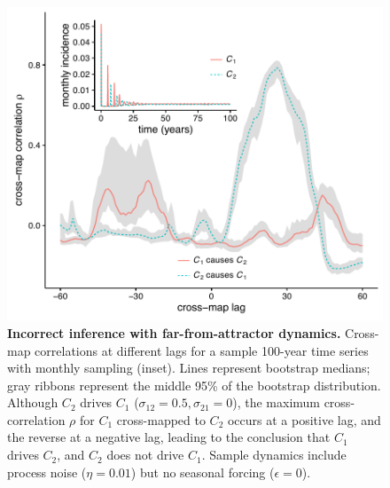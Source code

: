 \begin{figure}
\begin{center}
  \includegraphics[width=6in]{dataflow/out/fig_transient/fig_transient.pdf}
  \end{center}
  \caption{\textbf{Incorrect inference with far-from-attractor dynamics.} Cross-map correlations at different lags for a sample 100-year time series with monthly sampling (inset). Lines represent bootstrap medians; gray ribbons represent the middle 95\% of the bootstrap distribution. Although $C_2$ drives $C_1$ ($\sigma_{12}= 0.5, \sigma_{21}=0$), the maximum cross-correlation $\rho$ for $C_1$ cross-mapped to $C_2$ occurs at a positive lag, and the reverse at a negative lag, leading to the conclusion that $C_1$ drives $C_2$, and $C_2$ does not drive $C_1$. Sample dynamics include process noise ($\eta=0.01$) but no seasonal forcing ($\epsilon=0$). \label{fig:transient}} 
\end{figure}

